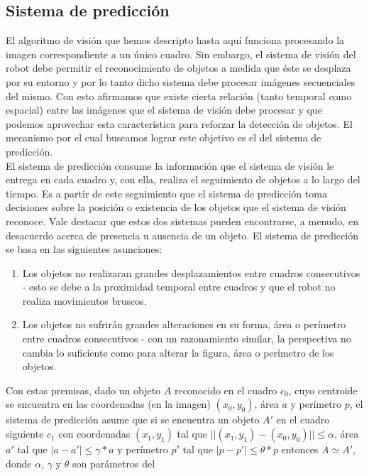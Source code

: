 	\subsection{Sistema de predicci\'on}
	El algoritmo de visi\'on que hemos descripto hasta aqu\'i funciona 
	procesando la imagen correspondiente a un \'unico cuadro. Sin embargo, 
	el sistema de visi\'on del robot debe permitir el reconocimiento de 
	objetos a medida que \'este se desplaza por su entorno y por lo tanto 
	dicho sistema debe procesar im\'agenes secuenciales del mismo. Con 
	esto afirmamos que existe cierta relaci\'on (tanto temporal como 
	espacial) entre las im\'agenes 
	que el sistema de visi\'on debe procesar y que podemos aprovechar esta 
	caracter\'istica para reforzar la detecci\'on de objetos. El mecanismo por el cual buscamos lograr este objetivo es el del sistema de predicci\'on.\\
\indent 	El sistema de predicci\'on consume la informaci\'on que el 
sistema de visi\'on le entrega en cada cuadro y, con ella, realiza el 
seguimiento de objetos a lo largo del tiempo. Es a partir de este 
seguimiento que el sistema de predicci\'on toma decisiones sobre la 
posici\'on o existencia de los objetos que el sistema de visi\'on 
reconoce. Vale destacar que estos dos sistemas pueden encontrarse, a 
menudo, en desacuerdo acerca de presencia u ausencia 
de un objeto.  El sistema de predicci\'on se basa en las siguientes asunciones:
\begin{enumerate}
\item{ Los objetos no realizaran grandes desplazamientos entre cuadros 
consecutivos - esto se debe a la proximidad temporal entre cuadros y que el robot no realiza movimientos bruscos.}
\item{ Los objetos no sufrir\'an grandes alteraciones en su forma, \'area 
o per\'imetro entre cuadros consecutivos - con un razonamiento similar, la perspectiva no cambia lo suficiente como para alterar la figura, \'area o per\'imetro de los objetos.}
\end{enumerate} 
Con estas premisas, dado un objeto $A$ reconocido en el cuadro $c_0$, 
cuyo centroide se encuentra en las coordenadas (en la imagen) $(x_0,y_0)$, \'area $a$ y per\'imetro $p$, 
el sistema de predicci\'on asume que si se encuentra un objeto $A'$ en 
el cuadro siguiente $c_1$ con coordenadas $(x_1, y_1)$ tal que 
$||(x_1,y_1) - (x_0,y_0)||\leq \alpha$, \'area $a'$ tal que $|a-a'| \leq 
\gamma *a$ y per\'imetro $p'$ tal que $|p-p'|\leq \theta*p$ entonces $A 
\simeq A'$, donde $\alpha$, $\gamma$ y $\theta$ son par\'ametros del 
